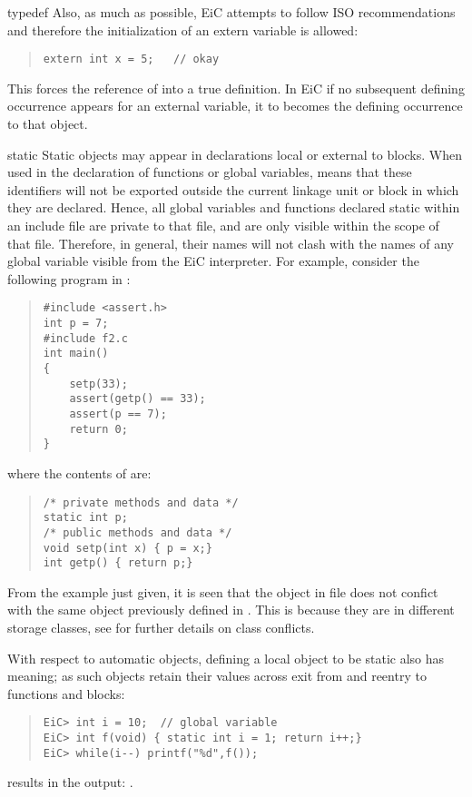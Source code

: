 \begin{Ventry}{typedef}
Also, as much as possible, EiC attempts to follow ISO recommendations
and therefore the initialization of an extern variable is allowed:
\begin{quote}
\begin{verbatim}
extern int x = 5;   // okay
\end{verbatim}
\end{quote}
 This forces the reference of  into a true definition. In EiC if no
subsequent defining occurrence appears for an external variable, it to
becomes the defining occurrence to that object.

\item[static]
\label{item:static}
Static objects may appear in declarations local or external to blocks.
When used in the declaration of functions or global variables,
 means that these identifiers will not be exported outside
the current linkage unit or block in which they are declared.  Hence,
all global variables and functions declared static within an include
file are private to that file, and are only visible within the scope
of that file. Therefore, in general, their names will not clash with
the names of any global variable visible from the EiC interpreter.
For example, consider the following program in :

\begin{quote}
\begin{verbatim}
#include <assert.h>
int p = 7;                                                  
#include f2.c
int main()
{
    setp(33);
    assert(getp() == 33);
    assert(p == 7);
    return 0;
}
\end{verbatim}
\end{quote}
 where the contents of  are:
\begin{quote}
\begin{verbatim}
/* private methods and data */
static int p;                
/* public methods and data */
void setp(int x) { p = x;}   
int getp() { return p;}      
\end{verbatim}
\end{quote}

From the example just given, it is seen that the object  in
file  does not confict with the same object 
previously defined in . This is because they are in different
storage classes, see  for further details
on class conflicts.

With respect to automatic objects, defining a local object to be
static also has meaning; as such objects retain their values across
exit from and reentry to functions and blocks:
\begin{quote}
\begin{verbatim}
EiC> int i = 10;  // global variable
EiC> int f(void) { static int i = 1; return i++;}
EiC> while(i--) printf("%d",f());
\end{verbatim}
\end{quote}
results in the output: . 


\end{Ventry}

